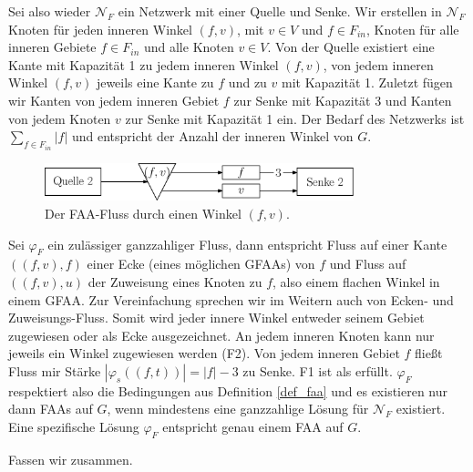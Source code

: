 Sei also wieder $\mathcal{N}_F$ ein Netzwerk mit einer Quelle und Senke. Wir erstellen in $\mathcal{N}_F$ Knoten für jeden inneren Winkel $(f,v)$, mit $v\in V$ und $f \in F_{in}$, Knoten für alle inneren Gebiete $f \in F_{in}$ und alle Knoten $v\in V$. Von der Quelle existiert eine Kante mit Kapazität 1 zu jedem inneren Winkel $(f,v)$, von jedem inneren Winkel $(f,v)$ jeweils eine Kante zu $f$ und zu $v$ mit Kapazität 1. Zuletzt fügen wir Kanten von jedem inneren Gebiet $f$ zur Senke mit Kapazität 3 und Kanten von jedem Knoten $v$ zur Senke mit Kapazität 1 ein. Der Bedarf des Netzwerks ist $\sum_{f \in F_{in}}{|f|}$ und entspricht der Anzahl der inneren Winkel von $G$.

\begin{figure}[h]
	\centering
  \includegraphics[width=0.8\textwidth]{faa_flow.png}
  \caption{Der FAA-Fluss durch einen Winkel $(f,v)$.}
  \label{faa_flow}
\end{figure}

Sei $\varphi_F$ ein zulässiger ganzzahliger Fluss, dann entspricht Fluss auf einer Kante $((f,v),f)$ einer Ecke (eines möglichen GFAAs) von $f$ und Fluss auf $((f,v),u)$ der Zuweisung eines Knoten zu $f$, also einem flachen Winkel in einem GFAA. Zur Vereinfachung sprechen wir im Weitern auch von Ecken- und Zuweisungs-Fluss. Somit wird jeder innere Winkel entweder seinem Gebiet zugewiesen oder als Ecke ausgezeichnet. An jedem inneren Knoten kann nur jeweils ein Winkel zugewiesen werden (F2). Von jedem inneren Gebiet $f$ fließt Fluss mir Stärke $|\varphi_s((f,t))| = |f|-3$ zu Senke. F1 ist als erfüllt. $\varphi_F$ respektiert also die Bedingungen aus Definition \ref{def_faa} und es existieren nur dann FAAs auf $G$, wenn mindestens eine ganzzahlige Lösung für $\mathcal{N}_F$ existiert. Eine spezifische Lösung $\varphi_F$ entspricht genau einem FAA auf $G$.

Fassen wir zusammen.

